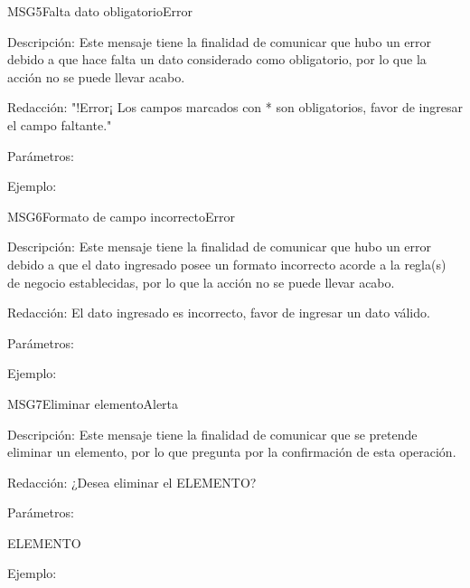 \begin{mensaje}{MSG5}{Falta dato obligatorio}{Error}
	\item[Descripción:]Este mensaje tiene la finalidad de comunicar que hubo un error debido a que hace falta un dato considerado como obligatorio, por lo que la acción no se puede llevar acabo.
	\item[Redacción:]"!Error¡ Los campos marcados con * son obligatorios, 
favor de ingresar el campo faltante."
	\item[Parámetros:] 
	\begin{Citemize}
 			\item 
		\end{Citemize}
	\item[Ejemplo:] 
\end{mensaje}

\begin{mensaje}{MSG6}{Formato de campo incorrecto}{Error}
	\item[Descripción:]Este mensaje tiene la finalidad de comunicar que hubo un error debido a que el dato ingresado posee un formato incorrecto acorde a la regla(s) de negocio establecidas, por lo que la acción no se puede llevar acabo.
	\item[Redacción:]El dato ingresado es incorrecto, favor de ingresar un dato válido.
	\item[Parámetros:] 
	\begin{Citemize}
 			\item 
		\end{Citemize}
	\item[Ejemplo:] 
\end{mensaje}

\begin{mensaje}{MSG7}{Eliminar elemento}{Alerta}
	\item[Descripción:]Este mensaje tiene la finalidad de comunicar que se pretende eliminar un elemento, por lo que pregunta por la confirmación de esta operación.
	\item[Redacción:]¿Desea eliminar el ELEMENTO?
	\item[Parámetros:] \hspace{0.1pt}
	\begin{Citemize}
 			\item ELEMENTO
		\end{Citemize}
	\item[Ejemplo:] 
\end{mensaje}

